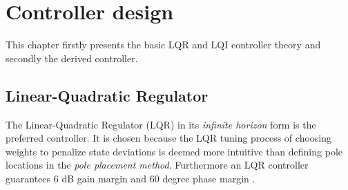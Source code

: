 \section{Controller design} \label{sec:ctrl-design}
This chapter firstly presents the basic LQR and LQI controller theory and secondly the derived controller. 

\subsection{Linear-Quadratic Regulator} \label{sec:ctrl_lqr}
The Linear-Quadratic Regulator (LQR) in its \textit{infinite horizon} form is the preferred controller. It is chosen because the LQR tuning process of choosing weights to penalize state deviations is deemed more intuitive than defining pole locations in the \textit{pole placement method}. Furthermore an LQR controller guarantees 6 dB gain margin and 60 degree phase margin \cite{Doyle1978}. 


